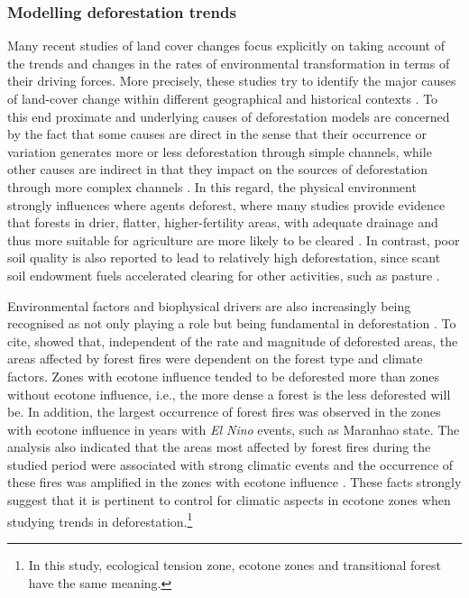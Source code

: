 \subsubsection{Modelling deforestation trends}  %


Many recent studies of land cover changes focus explicitly on taking account of the trends and changes in the rates of environmental transformation in terms of their driving forces. More precisely, these studies try to identify the major causes of land-cover change within different geographical and historical contexts \citep{GEIST}. To this end proximate and underlying causes of deforestation models are concerned by the fact that some causes are direct in the sense that their occurrence or variation generates more or less deforestation through simple channels, while other causes are indirect in that they impact on the sources of deforestation through more complex channels \citep{MOTEL}. In this regard, the physical environment strongly influences where agents deforest, where many studies provide evidence that forests in drier, flatter, higher-fertility areas, with adequate drainage and thus more suitable for agriculture are more likely to be cleared \citep{ANGELSEN4}. In contrast, poor soil quality is also reported to lead to relatively high deforestation, since scant soil endowment fuels accelerated clearing for other activities, such as pasture \citep{GEIST,COSTA}. 

Environmental factors and  biophysical drivers are also increasingly being recognised as not only playing a role but being fundamental in deforestation \citep{GEIST}. To cite, \citet{BARNI} showed that, independent of the rate and magnitude of deforested areas, the areas affected by forest fires were dependent on the forest type and climate factors. Zones with ecotone influence tended to be deforested more than zones without ecotone influence, i.e., the more dense a forest is the less deforested will be. In addition, the largest occurrence of forest fires was observed in the zones with ecotone influence in years with \textit{El Nino} events, such as Maranhao state. The analysis also indicated that the areas most affected by forest fires during the studied period were associated with strong climatic events and the occurrence of these fires was amplified in the zones with ecotone influence \citep{BARNI}. These facts strongly suggest that it is pertinent to control for climatic aspects in ecotone zones when studying trends in deforestation.\footnote{In this study, ecological tension zone, ecotone zones and transitional forest have the same meaning. } 



